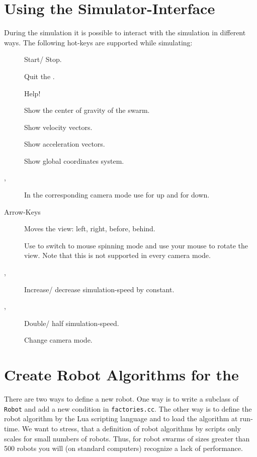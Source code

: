 \documentclass[a4paper,halfparskip,11pt,twoside]{scrartcl}
\begin{document}
\section{Using the Simulator-Interface}
During the simulation it is possible to interact with the simulation in different ways. The following hot-keys are supported while simulating:

\begin{description}
	\item [] Start/ Stop.
	\item [] Quit the \RSS.
	\item [] Help!
	\item [] Show the center of gravity of the swarm.
	\item [] Show velocity vectors.
	\item [] Show acceleration vectors.
	\item [] Show global coordinates system.
	\item [,] In the corresponding camera mode use  for up  and  for down.
	\item [Arrow-Keys] Moves the view: left, right, before, behind.
	\item [] Use  to switch to mouse spinning mode and use your mouse to rotate the view. Note that this is not supported in every camera mode.
	\item [\fbox{\tt +}, \fbox{\tt -}] Increase/ decrease simulation-speed by constant.
	\item [\fbox{\tt *},\fbox{\tt /}] Double/ half simulation-speed.
	\item [] Change camera mode.
\end{description}

\section{Create Robot Algorithms for the \RSS}
There are two ways to define a new robot. One way is to write a subclass of \texttt{Robot} and add a new condition in \texttt{factories.cc}. The other way is to define the robot algorithm by the {\sffamily Lua} scripting language and to load the algorithm at run-time. We want to stress, that a definition of robot algorithms by \Lua scripts only scales for small numbers of robots. Thus, for robot swarms of sizes greater than 500 robots you will (on standard computers) recognize a lack of performance.
\end{document}
